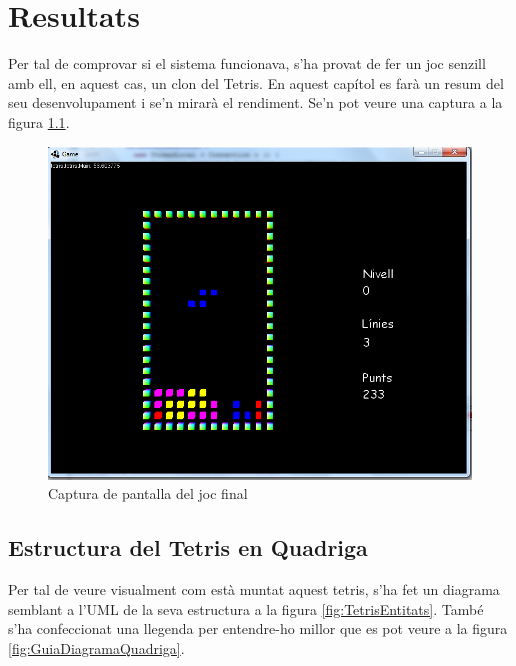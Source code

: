 \chapter{Resultats}
\label{chap:Resultats}

  Per tal de comprovar si el sistema funcionava, s'ha provat de fer un joc senzill amb ell, en aquest cas, un clon del Tetris. En aquest capítol es farà un resum del seu desenvolupament i se'n mirarà el rendiment. Se'n pot veure una captura a la figura \ref{fig:ImatgeTetris}.

  \begin{figure}
    \centering
    \includegraphics[width=0.5\linewidth]{./img/ImatgeTetris.png}
    \caption{Captura de pantalla del joc final \label{fig:ImatgeTetris}}
  \end{figure}

\section{Estructura del Tetris en Quadriga}

  Per tal de veure visualment com està muntat aquest tetris, s'ha fet un diagrama semblant a l'UML de la seva estructura a la figura \ref{fig:TetrisEntitats}. També s'ha confeccionat una llegenda per entendre-ho millor que es pot veure a la figura \ref{fig:GuiaDiagramaQuadriga}.

